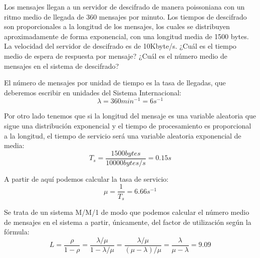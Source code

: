 \begin{problem}[1]
Los mensajes llegan a un servidor de descifrado de manera poissoniana con un ritmo medio de llegada de 360 mensajes por minuto. Los tiempos de descifrado son proporcionales a la longitud de los mensajes, los cuales se distribuyen aproximadamente de forma exponencial, con una longitud media de 1500 bytes. La velocidad del servidor de descifrado es de 10Kbyte/s. ¿Cuál es el tiempo medio de espera de respuesta por mensaje? ¿Cuál es el número medio de mensajes en el sistema de descifrado?

\solution

\yoP


El número de mensajes por unidad de tiempo es la tasa de llegadas, que deberemos escribir en unidades del Sistema Internacional:
\[λ = 360 min^{-1}=6 s^{-1}\]

Por otro lado tenemos que si la longitud del mensaje es una variable aleatoria que sigue una distribución exponencial y el tiempo de procesamiento es proporcional a la longitud, el tiempo de servicio será una variable aleatoria exponencial de media:
\[T_s = \frac{1500 bytes}{10000 bytes/s} = \boxed{0.15s}\]

A partir de aquí podemos calcular la tasa de servicio:
\[μ = \frac{1}{T_s} = 6.66 s^{-1}\]

Se trata de un sistema M/M/1 de modo que podemos calcular el número medio de mensajes en el sistema a partir, únicamente, del factor de utilización según la fórmula:
\[L=\frac{ρ}{1-ρ}=\frac{λ/μ}{1-λ/μ}=\frac{λ/μ}{(μ-λ)/μ}=\frac{λ}{μ-λ}=\boxed{9.09}\]


\end{problem}


